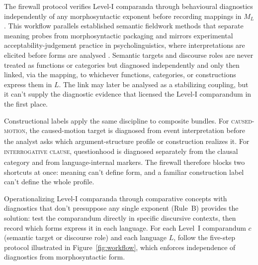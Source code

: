 \documentclass[12pt]{article}
\begin{document}
The firewall protocol verifies Level-I comparanda through behavioural diagnostics independently of any morphosyntactic exponent before recording mappings in $M_L$. This workflow parallels established semantic fieldwork methods that separate meaning probes from morphosyntactic packaging \parencite{Matthewson2004} and mirrors experimental acceptability-judgement practice in psycholinguistics, where interpretations are elicited before forms are analysed \parencite{Cowart1997,schutze2016}. Semantic targets and discourse roles are never treated as functions or categories but diagnosed independently and only then linked, via the mapping, to whichever functions, categories, or constructions express them in $L$. The link may later be analysed as a stabilizing coupling, but it can't supply the diagnostic evidence that licensed the Level-I comparandum in the first place.

Constructional labels apply the same discipline to composite bundles. For \textsc{caused-motion}\textsubscript{\Cross}, the caused-motion target is diagnosed from event interpretation before the analyst asks which argument-structure profile or construction realizes it. For \textsc{interrogative clause}\textsubscript{\Cross}, questionhood is diagnosed separately from the clausal category and from language-internal markers. The firewall therefore blocks two shortcuts at once: meaning can't define form, and a familiar construction label can't define the whole profile.

Operationalizing Level-I comparanda through comparative concepts with diagnostics that don't presuppose any single exponent (Rule~B) provides the solution: test the comparandum directly in specific discursive contexts, then record which forms express it in each language. For each Level~I comparandum $c$ (semantic target or discourse role) and each language $L$, follow the five-step protocol illustrated in Figure~\ref{fig:workflow}, which enforces independence of diagnostics from morphosyntactic form.
\end{document}
